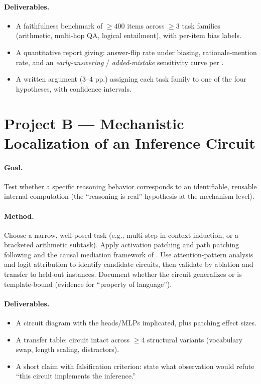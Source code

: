 \documentclass[11pt]{article}
\begin{document}
\paragraph{Deliverables.}
\begin{itemize}[leftmargin=1.4em]
  \item A faithfulness benchmark of $\geq 400$ items across $\geq 3$ task
    families (arithmetic, multi-hop QA, logical entailment), with per-item
    bias labels.
  \item A quantitative report giving: answer-flip rate under biasing,
    rationale-mention rate, and an \emph{early-answering} / \emph{added-mistake}
    sensitivity curve per \citet{lanham2023measuring}.
  \item A written argument (3--4 pp.) assigning each task family to one of
    the four hypotheses, with confidence intervals.
\end{itemize}

\section{Project B --- Mechanistic Localization of an Inference Circuit}

\paragraph{Goal.} Test whether a specific reasoning behavior corresponds to
an identifiable, reusable internal computation (the ``reasoning is real''
hypothesis at the mechanism level).

\paragraph{Method.} Choose a narrow, well-posed task (e.g., multi-step
in-context induction, or a bracketed arithmetic subtask). Apply activation
patching and path patching following \citet{wang2023ioi} and the causal
mediation framework of \citet{meng2022rome}. Use attention-pattern analysis
and logit attribution to identify candidate circuits, then validate by
ablation and transfer to held-out instances. Document whether the circuit
generalizes or is template-bound (evidence for ``property of language'').

\paragraph{Deliverables.}
\begin{itemize}[leftmargin=1.4em]
  \item A circuit diagram with the heads/MLPs implicated, plus patching
    effect sizes.
  \item A transfer table: circuit intact across $\geq 4$ structural variants
    (vocabulary swap, length scaling, distractors).
  \item A short claim with falsification criterion: state what observation
    would refute ``this circuit implements the inference.''
\end{itemize}
\end{document}
